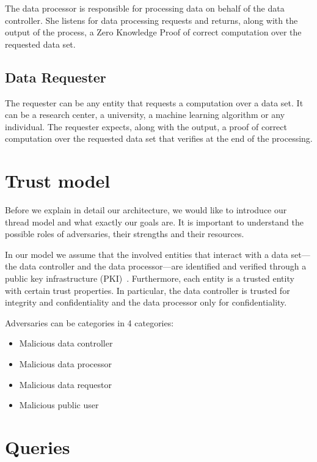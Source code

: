 The data processor is responsible for processing data on behalf of the data controller. She listens for data processing requests and returns, along with the output of the process, a Zero Knowledge Proof of correct computation over the requested data set.

\subsection{Data Requester}
\label{solution:entities:data_req}

The requester can be any entity that requests a computation over a data set. It can be a research center, a university, a machine learning algorithm or any individual. The requester expects, along with the output, a proof of correct computation over the requested data set that verifies at the end of the processing.

\section{Trust model}
\label{solution:trust_model}

Before we explain in detail our architecture, we would like to introduce our thread model and what exactly our goals are. It is important to understand the possible roles of adversaries, their strengths and their resources.

In our model we assume that the involved entities that interact with a data set---the data controller and the data processor---are identified and verified through a public key infrastructure (PKI)~\cite{adams_understanding_2003}. Furthermore, each entity is a trusted entity with certain trust properties. In particular, the data controller is trusted for integrity and confidentiality and the data processor only for confidentiality.

Adversaries can be categories in 4 categories:

\begin{itemize}
  \item Malicious data controller
  \item Malicious data processor
  \item Malicious data requestor
  \item Malicious public user
\end{itemize}

\section{Queries}
\label{solution:queries}

